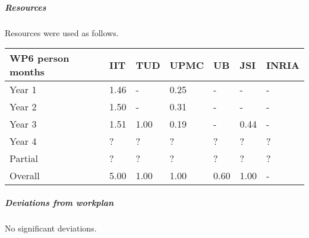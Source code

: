 

\subparagraph*{Resources}

Resources were used as follows.

\begin{center}
\begin{tabular}{|C{1.5cm}|C{1.5cm}|C{1.5cm}|C{2cm}|C{2cm}|C{2cm}|C{2cm}|}
\hline
\footnotesize \textbf{WP6 person months}& \footnotesize \textbf{IIT}&\footnotesize \textbf{TUD}&\footnotesize \textbf{UPMC}& \footnotesize \textbf{UB} &\footnotesize \textbf{JSI} & \footnotesize \textbf{INRIA} \\ \hline
\footnotesize Year 1 &  1.46 & - & 0.25 & - & - & -    \\  \hline
\footnotesize Year 2 &  1.50 & - & 0.31 & - & - & -     \\  \hline
\footnotesize Year 3 &  1.51 & 1.00 & 0.19 & - & 0.44 & - \\ \hline
\footnotesize Year 4  & ?     & ?    & ?    & ?    & ?    & ?    \\   	\hline
\footnotesize Partial & ?     & ?    & ?    & ?    & ?    & ?    \\
\hline \hline
\footnotesize Overall &  5.00 & 1.00 & 1.00 & 0.60 & 1.00 & - \\ \hline
\end{tabular}
\end{center}

\subparagraph*{Deviations from workplan} 
No significant deviations. 